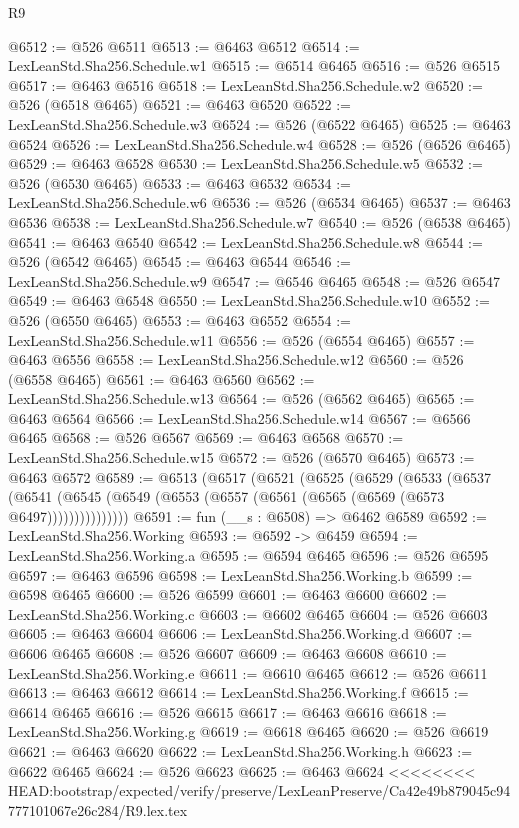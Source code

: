 \begin{lexlean}{R9}
\begin{coremodule}
{{{{{{{{{{{{{{{{{{{{{{{{{{{{{{{{{{{{{{{{{{{{{{{{{{{{{{{{{{{{{{{{{{{{{{{{{{{{{{{{{{{{@6512 := @526 @6511
@6513 := @6463 @6512
@6514 := LexLeanStd.Sha256.Schedule.w1
@6515 := @6514 @6465
@6516 := @526 @6515
@6517 := @6463 @6516
@6518 := LexLeanStd.Sha256.Schedule.w2
@6520 := @526 (@6518 @6465)
@6521 := @6463 @6520
@6522 := LexLeanStd.Sha256.Schedule.w3
@6524 := @526 (@6522 @6465)
@6525 := @6463 @6524
@6526 := LexLeanStd.Sha256.Schedule.w4
@6528 := @526 (@6526 @6465)
@6529 := @6463 @6528
@6530 := LexLeanStd.Sha256.Schedule.w5
@6532 := @526 (@6530 @6465)
@6533 := @6463 @6532
@6534 := LexLeanStd.Sha256.Schedule.w6
@6536 := @526 (@6534 @6465)
@6537 := @6463 @6536
@6538 := LexLeanStd.Sha256.Schedule.w7
@6540 := @526 (@6538 @6465)
@6541 := @6463 @6540
@6542 := LexLeanStd.Sha256.Schedule.w8
@6544 := @526 (@6542 @6465)
@6545 := @6463 @6544
@6546 := LexLeanStd.Sha256.Schedule.w9
@6547 := @6546 @6465
@6548 := @526 @6547
@6549 := @6463 @6548
@6550 := LexLeanStd.Sha256.Schedule.w10
@6552 := @526 (@6550 @6465)
@6553 := @6463 @6552
@6554 := LexLeanStd.Sha256.Schedule.w11
@6556 := @526 (@6554 @6465)
@6557 := @6463 @6556
@6558 := LexLeanStd.Sha256.Schedule.w12
@6560 := @526 (@6558 @6465)
@6561 := @6463 @6560
@6562 := LexLeanStd.Sha256.Schedule.w13
@6564 := @526 (@6562 @6465)
@6565 := @6463 @6564
@6566 := LexLeanStd.Sha256.Schedule.w14
@6567 := @6566 @6465
@6568 := @526 @6567
@6569 := @6463 @6568
@6570 := LexLeanStd.Sha256.Schedule.w15
@6572 := @526 (@6570 @6465)
@6573 := @6463 @6572
@6589 := @6513
    (@6517
      (@6521
        (@6525
          (@6529
            (@6533
              (@6537
                (@6541 (@6545 (@6549 (@6553 (@6557 (@6561 (@6565 (@6569 (@6573 @6497)))))))))))))))
@6591 := fun (__s : @6508) => @6462 @6589
@6592 := LexLeanStd.Sha256.Working
@6593 := @6592 -> @6459
@6594 := LexLeanStd.Sha256.Working.a
@6595 := @6594 @6465
@6596 := @526 @6595
@6597 := @6463 @6596
@6598 := LexLeanStd.Sha256.Working.b
@6599 := @6598 @6465
@6600 := @526 @6599
@6601 := @6463 @6600
@6602 := LexLeanStd.Sha256.Working.c
@6603 := @6602 @6465
@6604 := @526 @6603
@6605 := @6463 @6604
@6606 := LexLeanStd.Sha256.Working.d
@6607 := @6606 @6465
@6608 := @526 @6607
@6609 := @6463 @6608
@6610 := LexLeanStd.Sha256.Working.e
@6611 := @6610 @6465
@6612 := @526 @6611
@6613 := @6463 @6612
@6614 := LexLeanStd.Sha256.Working.f
@6615 := @6614 @6465
@6616 := @526 @6615
@6617 := @6463 @6616
@6618 := LexLeanStd.Sha256.Working.g
@6619 := @6618 @6465
@6620 := @526 @6619
@6621 := @6463 @6620
@6622 := LexLeanStd.Sha256.Working.h
@6623 := @6622 @6465
@6624 := @526 @6623
@6625 := @6463 @6624
<<<<<<<< HEAD:bootstrap/expected/verify/preserve/LexLeanPreserve/Ca42e49b879045c94777101067e26c284/R9.lex.tex
}}}}}}}}}}}}}}}}}}}}}}}}}}}}}}}}}}}}}}}}}}}}}}}}}}}}}}}}}}}}}}}}}}}}}}}}}}}}}}}}}}}}
\end{coremodule}
\end{lexlean}
